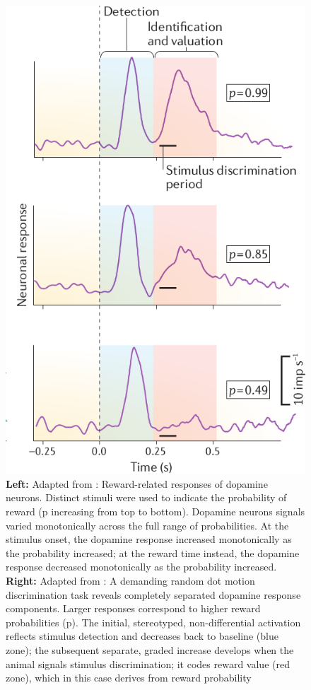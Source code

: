 \begin{figure}[H]
    \includegraphics[scale=0.35]{figures/ResponseProbSchultz.png}
    \caption{\textbf{Left:} Adapted from \cite{Fiorillo}: Reward-related responses of dopamine neurons. Distinct stimuli were used to indicate the probability of reward (p increasing from top to bottom). Dopamine neurons signals varied monotonically across the full range of probabilities. At the stimulus onset, the dopamine response increased monotonically as the probability increased; at the reward time instead, the dopamine response decreased monotonically as the probability increased. \textbf{Right:} Adapted from \cite{Schultz2016}: A demanding random dot motion discrimination task reveals completely separated dopamine response components. Larger responses correspond to higher reward probabilities (p). The initial, stereotyped, non-differential activation reflects stimulus detection and decreases back to baseline (blue zone); the subsequent separate, graded increase develops when the animal signals stimulus discrimination; it codes reward value (red zone), which in this case derives from reward probability}
    \label{fig:probDopamine}
\end{figure}
